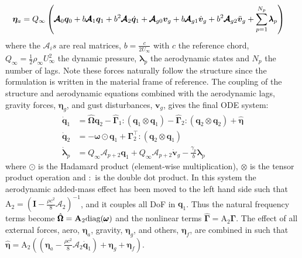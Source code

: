 \documentclass[11pt]{article}
\begin{document}
\begin{equation}\label{eq3:eta_full}
\begin{split}
\bm{\eta}_a = Q_\infty & \left(\vphantom{\sum_{p=1}^{N_p}} \pmb{\mathcal{A}}_0\bm{q}_0 +b\pmb{\mathcal{A}}_1 \bm{q}_1 +b^2 \pmb{\mathcal{A}}_2\dot{\bm{q}}_1    + \pmb{\mathcal{A}}_{g0}\bm{v}_g +b\pmb{\mathcal{A}}_{g1} \dot{\bm{v}}_g +b^2 \pmb{\mathcal{A}}_{g2}\ddot{\bm{v}}_g +  \sum_{p=1}^{N_p} \pmb{\lambda}_p  \right) 
\end{split}
\end{equation}
where the \(\pmb{\mathcal{A}}_is\) are real matrices, \(b=\frac{c}{2U_\infty}\) with \(c\) the reference chord, \(Q_\infty = \tfrac12\rho_\infty U_\infty^2\) the dynamic pressure, \(\pmb{\lambda}_p\) the aerodynamic states and \(N_p\) the number of lags. Note these forces naturally follow the structure since the formulation is written in the material frame of reference. 
The coupling of the structure and aerodynamic equations combined with the aerodynamic lags, gravity forces, \(\bm{\eta}_g\), and gust disturbances, \(\bm{v}_g\), gives the final ODE system: 
\begin{equation}
\label{eq2:sol_qs}
\begin{split}
\dot{\pmb{q}}_{1} &=  \hat{\pmb{\Omega}}  \pmb{q}_{2} - \hat{\pmb{\Gamma}}_{1} \pmb{:} \left(\pmb{q}_{1} \otimes \pmb{q}_{1} \right) - \hat{\pmb{\Gamma}}_{2} \pmb{:} \left( \pmb{q}_{2} \otimes  \pmb{q}_{2} \right) + \hat{\bm{\eta}}  \\
\dot{\pmb{q}}_{2} &= -\pmb{\omega} \odot \pmb{q}_{1} + \pmb{\Gamma}_{2}^{\top} \pmb{:} \left( \pmb{q}_{2} \otimes  \pmb{q}_{1} \right) \\
\dot{\bm{\lambda}}_{p} &= Q_{\infty}\bm{\mathcal{A}}_{p+2}\pmb{q}_{1}
                       + Q_{\infty}\bm{\mathcal{A}}_{p+2}\dot{\pmb{v}}_g
                       -\frac{\gamma_p}{b}\bm{\lambda}_{p}
\end{split}
\end{equation}
where \(\odot\) is the  Hadamard product (element-wise multiplication), \(\otimes\) is the tensor product operation and \(\pmb{:}\) is the double dot product.
In this system the aerodynamic added-mass effect has been moved to the left hand side such that \(\bm{\mathrm{A}}_2 = (\pmb{I} - \frac{\rho c^2}{8}\pmb{\mathcal{A}}_2)^{-1}\), and it couples all DoF in \(\pmb q_1\). Thus the natural frequency terms become \(\hat{\pmb{\Omega}} = \bm{\mathrm{A}}_2 \textup{diag}(\pmb{\omega})\) and the nonlinear terms \(\hat{\pmb{\Gamma}} = \bm{\mathrm{A}}_2 \bm{\Gamma}\). The effect of all external forces, aero, \(\bm{\eta}_a\), gravity, \(\bm{\eta}_g\), and others, \(\bm{\eta}_f\), are combined in such that \(\hat{\bm{\eta}} = \bm{\mathrm{A}}_2 \left( \left( \bm{\eta}_a - \frac{\rho c^2}{8} \pmb{\mathcal{A}}_2\dot{\bm{q}}_1 \right) +  \bm{\eta}_g + \bm{\eta}_f \right)\).
\end{document}

